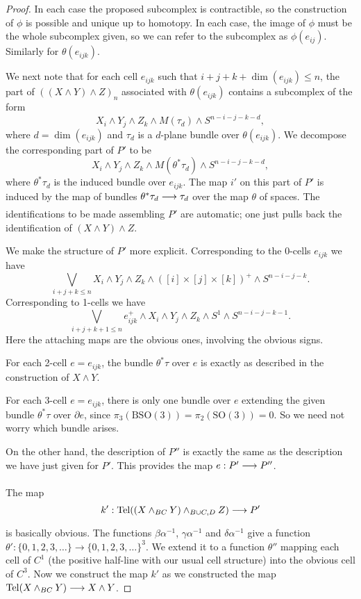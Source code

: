 \documentclass[../main]{subfiles}
\begin{document}
\begin{proof}
In each case the proposed subcomplex is contractible, so the construction of $\phi$ is possible and unique up to homotopy. In each case, the image of $\phi$ must be the whole subcomplex given, so we can refer to the subcomplex as $\phi(e_{ij})$. Similarly for $\theta(e_{ijk})$.

We next note that for each cell $e_{ijk}$ such that $i + j + k + \dim(e_{ijk}) \le n$, the part of $((X \wedge Y) \wedge Z)_n$ associated with $\theta(e_{ijk})$ contains a subcomplex of the form \[X_i \wedge Y_j \wedge Z_k \wedge M(\tau_d) \wedge S^{n - i - j - k - d},\] where $d = \dim(e_{ijk})$ and $\tau_d$ is a $d$-plane bundle over $\theta(e_{ijk})$. We decompose the corresponding part of $P'$ to be \[X_i \wedge Y_j \wedge Z_k \wedge M(\theta^\ast \tau_d) \wedge S^{n - i - j - k - d},\] where $\theta^\ast \tau_d$ is the induced bundle over $e_{ijk}$. The map $i'$ on this part of $P'$ is induced by the map of bundles $\theta^\ast \tau_d \lar{} \tau_d$ over the map $\theta$ of spaces. The identifications to be made assembling $P'$ are automatic; one just pulls back the identification of $(X \wedge Y) \wedge Z$. 

We make the structure of $P'$ more explicit. Corresponding to the 0-cells $e_{ijk}$ we have \[\bigvee_{i + j + k \le n} X_i \wedge Y_j \wedge Z_k \wedge ([i] \times [j] \times [k])^+ \wedge S^{n - i - j - k}.\] Corresponding to 1-cells we have \[\bigvee_{i + j + k + 1 \le n} e_{ijk}^+ \wedge X_i \wedge Y_j \wedge Z_k \wedge S^1 \wedge S^{n - i - j - k - 1}.\] Here the attaching maps are the obvious ones, involving the obvious signs. 

For each 2-cell $e = e_{ijk}$, the bundle $\theta^\ast \tau$ over $e$ is exactly as described in the construction of $X \wedge Y$.

For each 3-cell $e = e_{ijk}$, there is only one bundle over $e$ extending the given bundle $\theta^\ast \tau$ over $\partial e$, since $\pi_3(\mathrm{BSO}(3)) = \pi_2(\mathrm{SO}(3)) = 0$. So we need not worry which bundle arises. 

On the other hand, the description of $P''$ is exactly the same as the description we have just given for $P'$. This provides the map $e : P' \lar{} P''$. 

The map \[k' : \mathrm{Tel}((X \wedge_{BC} Y) \wedge_{B \cup C, D} Z) \lar{} P'\] is basically obvious. The functions $\beta \alpha^{-1}$, $\gamma \alpha^{-1}$ and $\delta \alpha^{-1}$ give a function $\theta' : \{0, 1, 2, 3, \ldots\} \to \{0, 1, 2, 3, \ldots\}^3$. We extend it to a function $\theta''$ mapping each cell of $C^1$ (the positive half-line with our usual cell structure) into the obvious cell of $C^3$. Now we construct the map $k'$ as we constructed the map $\mathrm{Tel}(X \wedge_{BC} Y) \lar{} X \wedge Y$.


\end{proof}
\end{document}
